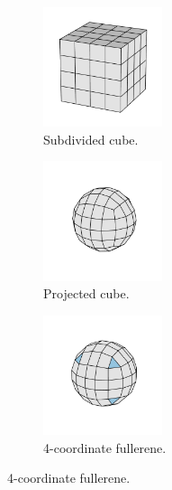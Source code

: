 \begin{figure}[bt]
     \vspace{0.2cm}
     \begin{subfigure}[b]{0.3\textwidth}
         \centering
         \includegraphics[height=3.5cm]{./figures/general_networks/full98_iso.pdf}
         \caption{Subdivided cube.}
         \label{fig:topo4}
     \end{subfigure}
     \hfill
     \begin{subfigure}[b]{0.3\textwidth}
         \centering
         \includegraphics[height=3.5cm]{./figures/general_networks/full98_iso_min.pdf}
         \caption{Projected cube.}
         \label{fig:topo5}
     \end{subfigure}
     \hfill
     \begin{subfigure}[b]{0.3\textwidth}
         \centering
         \includegraphics[height=3.5cm]{./figures/general_networks/full98.pdf}
         \caption{4\--coordinate fullerene.}
         \label{fig:topo6}
     \end{subfigure}
     \hfill
     

\end{figure}
